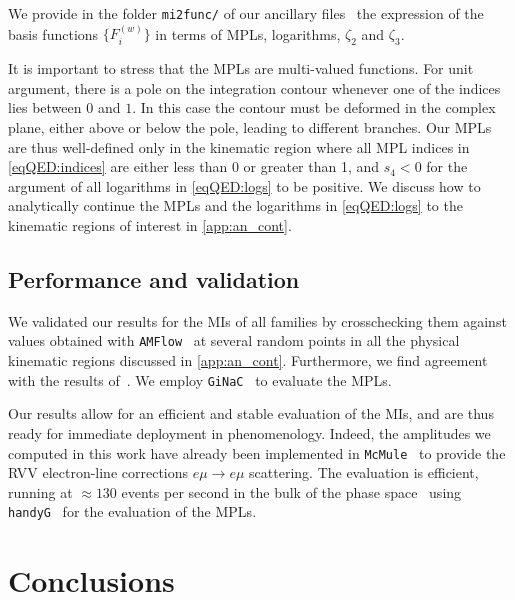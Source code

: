 \documentclass[main.tex]{subfiles}
\begin{document}
We provide in the folder \texttt{mi2func/} of our ancillary files~\cite{zenodo} the expression of the basis functions $\{F^{(w)}_i\}$ in terms of \acp{MPL}, logarithms, $\zeta_2$ and $\zeta_3$.

\smallskip

It is important to stress that the \acp{MPL} are multi-valued functions.
For unit argument, there is a pole on the integration contour whenever one of the indices lies between $0$ and $1$. In this case the contour must be deformed in the complex plane, either above or below the pole, leading to different branches. Our \acp{MPL} are thus well-defined only in the 
kinematic region where all \ac{MPL} indices in \cref{eqQED:indices} are either less than 0 or greater than 1, and $s_4 < 0$ for the argument of all logarithms in \cref{eqQED:logs} to be positive. We discuss how to analytically continue the \acp{MPL} and the logarithms in \cref{eqQED:logs} to the kinematic regions of interest in \cref{app:an_cont}.



\subsection{Performance and validation}
\label{secQED:performance}

We validated our results for the \acp{MI} of all families by crosschecking them against values obtained with \texttt{AMFlow}~\cite{Liu:2022chg} at several random points in all the physical kinematic regions discussed in \cref{app:an_cont}. Furthermore, we find agreement with the results of~. We employ \texttt{GiNaC}~\cite{Bauer:2000cp,Vollinga:2004sn} to evaluate the \acp{MPL}.

Our results allow for an efficient and stable evaluation of the \acp{MI}, and are thus ready for immediate deployment in phenomenology. Indeed, the amplitudes we computed in this work have already been implemented in \texttt{McMule}~\cite{Banerjee:2020rww,ulrich_yannick_2022_6046769} to provide the \acl{RVV} electron-line corrections  $e \mu \to e \mu$ scattering. The evaluation is efficient, running at $\approx 130$ events per second in the bulk of the phase space~\cite{ulrich-radcor} using \texttt{handyG}~\cite{Naterop:2019xaf} for the evaluation of the \acp{MPL}.

\section{Conclusions}
\label{secQED:conc}
\end{document}

